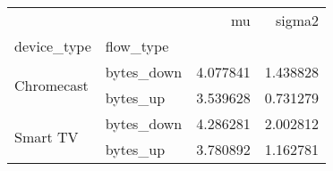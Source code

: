 \begin{tabular}{llrr}
\toprule
 &  & mu & sigma2 \\
device_type & flow_type &  &  \\
\midrule
\multirow[t]{2}{*}{Chromecast} & bytes_down & 4.077841 & 1.438828 \\
 & bytes_up & 3.539628 & 0.731279 \\
\cline{1-4}
\multirow[t]{2}{*}{Smart TV} & bytes_down & 4.286281 & 2.002812 \\
 & bytes_up & 3.780892 & 1.162781 \\
\cline{1-4}
\bottomrule
\end{tabular}
